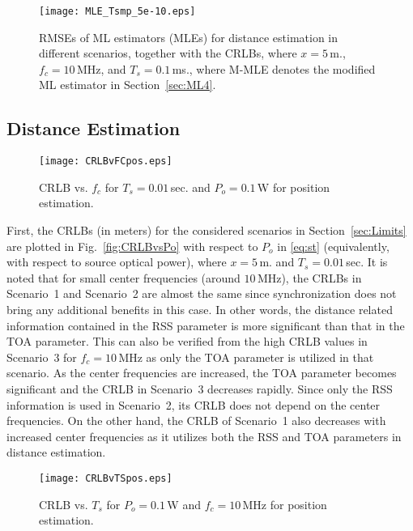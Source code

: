 \documentclass[10pt,twocolumn]{IEEEtran}
\begin{document}
\begin{figure}%
\centering
\texttt{[image: MLE\_Tsmp\_5e-10.eps]}
\caption{RMSEs of ML estimators (MLEs) for distance estimation in different scenarios, together with the CRLBs, where $x=5\,$m., $f_c=10\,$MHz, and $T_s=0.1\,$ms., where M-MLE denotes the modified ML estimator in Section~\ref{sec:ML4}.}
\label{fig:RMSEs}
\end{figure}

\subsection{Distance Estimation}\label{sec:DistanceRes}
%

\begin{figure}%
\centering
\texttt{[image: CRLBvFCpos.eps]}
\caption{CRLB vs. $f_c$ for $T_s = 0.01\,$sec. and $P_o = 0.1$\,W for position estimation.}
\label{fig:CRLBvFCpos}
\end{figure}

First, the CRLBs (in meters) for the considered scenarios in Section~\ref{sec:Limits} are plotted in Fig.~\ref{fig:CRLBvsPo} with respect to $P_o$ in \eqref{eq:st} (equivalently, with respect to source optical power), where $x = 5$\,m. and $T_s = 0.01\,$sec. It is noted that for small center frequencies (around $10\,$MHz), the CRLBs in Scenario~1 and Scenario~2 are almost the same since synchronization does not bring any additional benefits in this case. In other words, the distance related information contained in the RSS parameter is more significant than that in the TOA parameter. This can also be verified from the high CRLB values in Scenario~3 for $f_c=10\,$MHz as only the TOA parameter is utilized in that scenario. As the center frequencies are increased, the TOA parameter becomes significant and the CRLB in Scenario~3 decreases rapidly. Since only the RSS information is used in Scenario~2, its CRLB does not depend on the center frequencies. On the other hand, the CRLB of Scenario~1 also decreases with increased center frequencies as it utilizes both the RSS and TOA parameters in distance estimation.

\begin{figure}%
\centering
\texttt{[image: CRLBvTSpos.eps]}
\caption{CRLB vs. $T_s$ for $P_o = 0.1$\,W and $f_c = 10\,$MHz for position estimation.}
\label{fig:CRLBvTSpos}
\end{figure}
\end{document}
